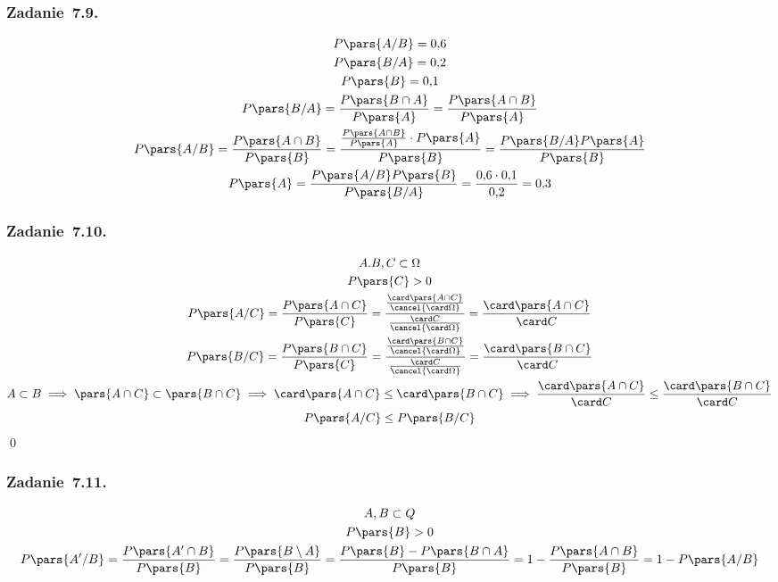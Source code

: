 \subsubsection*{Zadanie~7.9.}
\begin{gather*}
    P\pars{A / B} = 0{,}6\\
    P\pars{B / A} = 0{,}2\\
    P\pars{B} = 0{,}1\\
    P\pars{B / A} = \frac{P\pars{B \cap A}}{P\pars{A}}
        = \frac{P\pars{A \cap B}}{P\pars{A}}\\
    P\pars{A / B} = \frac{P\pars{A \cap B}}{P\pars{B}}
        = \frac{\frac{P\pars{A \cap B}}{P\pars{A}} \cdot P\pars{A}}{P\pars{B}}
        = \frac{P\pars{B / A}P\pars{A}}{P\pars{B}}\\
    P\pars{A}
        = \frac{P\pars{A / B}P\pars{B}}{P\pars{B / A}}
        = \frac{0{,}6 \cdot 0{,}1}{0{,}2}
        = 0{,}3
\end{gather*}
\subsubsection*{Zadanie~7.10.}
\begin{gather*}
    A. B, C \subset \Omega\\
    P\pars{C} > 0\\
    P\pars{A / C}
        = \frac{P\pars{A \cap C}}{P\pars{C}}
        = \frac{\frac{\card\pars{A \cap C}}{\cancel{\card\Omega}}}{\frac{\card C}{\cancel{\card\Omega}}}
        = \frac{\card\pars{A \cap C}}{\card C}\\
    P\pars{B / C}
        = \frac{P\pars{B \cap C}}{P\pars{C}}
        = \frac{\frac{\card\pars{B \cap C}}{\cancel{\card\Omega}}}{\frac{\card C}{\cancel{\card\Omega}}}
        = \frac{\card\pars{B \cap C}}{\card C}\\
    A \subset B \implies \pars{A \cap C} \subset \pars{B \cap C} \implies \card\pars{A \cap C} \leq \card\pars{B \cap C} \implies \frac{\card\pars{A \cap C}}{\card C} \leq \frac{\card\pars{B \cap C}}{\card C}\\
    P\pars{A / C} \leq P\pars{B / C}
\end{gather*}
\qed
\subsubsection*{Zadanie~7.11.}
\begin{gather*}
    A, B \subset Q\\
    P\pars{B} > 0\\
    P\pars{A' / B}
        = \frac{P\pars{A' \cap B}}{P\pars{B}}
        = \frac{P\pars{B \setminus A}}{P\pars{B}}
        = \frac{P\pars{B} - P\pars{B \cap A}}{P\pars{B}}
        = 1 - \frac{P\pars{A \cap B}}{P\pars{B}}
        = 1 - P\pars{A / B}
\end{gather*}
